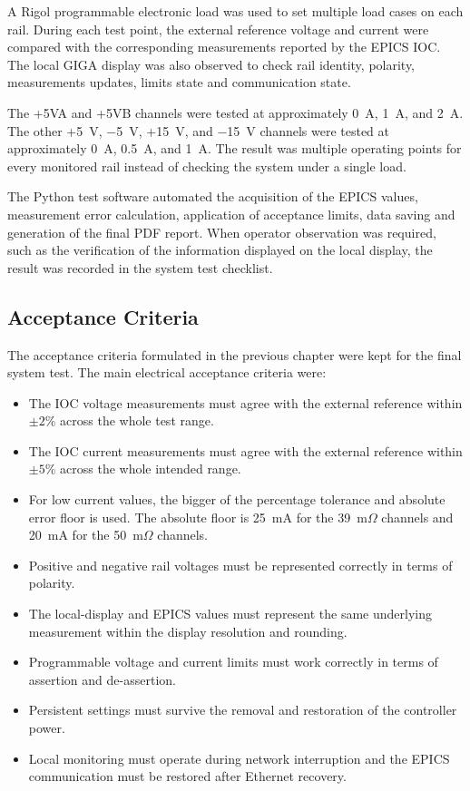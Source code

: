 A Rigol programmable electronic load was used to set multiple load cases on each rail. During each test point, the external reference voltage and current were compared with the corresponding measurements reported by the EPICS IOC. The local GIGA display was also observed to check rail identity, polarity, measurements updates, limits state and communication state.

The +5VA and +5VB channels were tested at approximately 0~A, 1~A, and 2~A. The other +5~V, $-$5~V, +15~V, and $-$15~V channels were tested at approximately 0~A, 0.5~A, and 1~A. The result was multiple operating points for every monitored rail instead of checking the system under a single load.

The Python test software automated the acquisition of the EPICS values, measurement error calculation, application of acceptance limits, data saving and generation of the final PDF report. When operator observation was required, such as the verification of the information displayed on the local display, the result was recorded in the system test checklist.

\subsection{Acceptance Criteria}

The acceptance criteria formulated in the previous chapter were kept for the final system test. The main electrical acceptance criteria were:

\begin{itemize}
	\item The IOC voltage measurements must agree with the external reference within $\pm2\%$ across the whole test range.
	\item The IOC current measurements must agree with the external reference within $\pm5\%$ across the whole intended range.
	\item For low current values, the bigger of the percentage tolerance and absolute error floor is used. The absolute floor is 25~mA for the 39~m$\Omega$ channels and 20~mA for the 50~m$\Omega$ channels.
	\item Positive and negative rail voltages must be represented correctly in terms of polarity.
	\item The local-display and EPICS values must represent the same underlying measurement within the display resolution and rounding.
	\item Programmable voltage and current limits must work correctly in terms of assertion and de-assertion.
	\item Persistent settings must survive the removal and restoration of the controller power.
	\item Local monitoring must operate during network interruption and the EPICS communication must be restored after Ethernet recovery.
\end{itemize}

